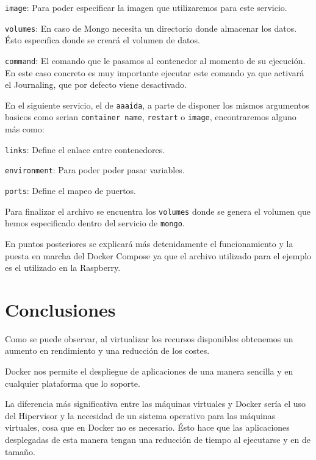\texttt{image}: Para poder especificar la imagen que utilizaremos para este servicio.

\texttt{volumes}: En caso de Mongo necesita un directorio donde almacenar los datos. Ésto especıfica donde se creará el volumen de datos.

\texttt{command}:  El comando que le pasamos al contenedor al momento de su ejecución. En este caso concreto es muy importante ejecutar este comando ya que activará el Journaling, que por defecto viene desactivado.

En el siguiente servicio, el de \texttt{aaaida}, a parte de disponer los mismos argumentos basicos como serian \texttt{container name}, \texttt{restart} o \texttt{image}, encontraremos alguno más como:

\texttt{links}: Define el enlace entre contenedores.

\texttt{environment}: Para poder poder pasar variables.

\texttt{ports}: Define el mapeo de puertos.

Para finalizar el archivo se encuentra los \texttt{volumes} donde se genera el volumen que hemos especificado dentro del servicio de \texttt{mongo}.  

En puntos posteriores se explicará más detenidamente el funcionamiento y la puesta en marcha del Docker Compose ya que el archivo utilizado para el ejemplo es el utilizado en la Raspberry.

\section{Conclusiones}

Como se puede observar, al virtualizar los recursos disponibles obtenemos un aumento en rendimiento y una reducción de los costes. 

Docker nos permite el despliegue de aplicaciones de una manera sencilla y en cualquier plataforma que lo soporte. 

La diferencia más significativa entre las máquinas virtuales y Docker sería el uso del Hipervisor y la necesidad de un sistema operativo para las máquinas virtuales, cosa que en Docker no es necesario. Ésto hace que las aplicaciones desplegadas de esta manera tengan una reducción de tiempo al ejecutarse y en de tamaño.  

